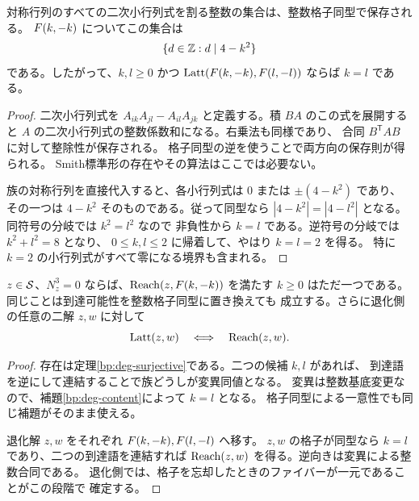 \begin{lemma}[退化パラメータの格子不変量]
\label{bp:deg-content}
\leanok
{}
対称行列のすべての二次小行列式を割る整数の集合は、整数格子同型で保存される。
\(F(k,-k)\) についてこの集合は
\[
 \{d\in\mathbb Z:d\mid4-k^2\}
\]
である。したがって、\(k,l\ge0\) かつ
\(\operatorname{Latt}(F(k,-k),F(l,-l))\) ならば \(k=l\) である。
\end{lemma}
\begin{proof}
\leanok
二次小行列式を
\(A_{ik}A_{jl}-A_{il}A_{jk}\) と定義する。積 \(BA\) のこの式を展開すると
\(A\) の二次小行列式の整数係数和になる。右乗法も同様であり、
合同 \(B^{\mathsf T}AB\) に対して整除性が保存される。
格子同型の逆を使うことで両方向の保存則が得られる。
Smith標準形の存在やその算法はここでは必要ない。

族の対称行列を直接代入すると、各小行列式は \(0\) または \(\pm(4-k^2)\) であり、
その一つは \(4-k^2\) そのものである。従って同型なら
\(|4-k^2|=|4-l^2|\) となる。同符号の分岐では \(k^2=l^2\) なので
非負性から \(k=l\) である。逆符号の分岐では \(k^2+l^2=8\) となり、
\(0\le k,l\le2\) に帰着して、やはり \(k=l=2\) を得る。
特に \(k=2\) の小行列式がすべて零になる境界も含まれる。
\end{proof}

\begin{theorem}[退化側の完全分類]
\label{bp:deg-classification}
\leanok
\(z\in\mathcal S\)、\(N_z^3=0\) ならば、\(\operatorname{Reach}(z,F(k,-k))\) を満たす
\(k\ge0\) はただ一つである。同じことは到達可能性を整数格子同型に置き換えても
成立する。さらに退化側の任意の二解 \(z,w\) に対して
\[
 \operatorname{Latt}(z,w)\quad\Longleftrightarrow\quad\operatorname{Reach}(z,w).
\]
\end{theorem}
\begin{proof}
\leanok
存在は定理\ref{bp:deg-surjective}である。二つの候補 \(k,l\) があれば、
到達語を逆にして連結することで族どうしが変異同値となる。
変異は整数基底変更なので、補題\ref{bp:deg-content}によって \(k=l\) となる。
格子同型による一意性でも同じ補題がそのまま使える。

退化解 \(z,w\) をそれぞれ \(F(k,-k),F(l,-l)\) へ移す。
\(z,w\) の格子が同型なら \(k=l\) であり、二つの到達語を連結すれば
\(\operatorname{Reach}(z,w)\) を得る。逆向きは変異による整数合同である。
退化側では、格子を忘却したときのファイバーが一元であることがこの段階で
確定する。
\end{proof}

